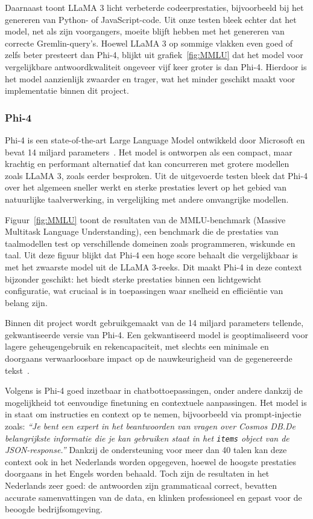 Daarnaast toont LLaMA 3 licht verbeterde codeerprestaties, bijvoorbeeld bij het genereren van Python- of JavaScript-code. 
Uit onze testen bleek echter dat het model, net als zijn voorgangers, moeite blijft hebben met het genereren van correcte Gremlin-query's.
Hoewel LLaMA 3 op sommige vlakken even goed of zelfs beter presteert dan Phi-4, blijkt uit grafiek~\ref{fig:MMLU} dat het model voor vergelijkbare antwoordkwaliteit ongeveer vijf keer groter is dan Phi-4.
Hierdoor is het model aanzienlijk zwaarder en trager, wat het minder geschikt maakt voor implementatie binnen dit project.

\subsubsection{Phi-4}{\label{sec:phi4}}
Phi-4 is een state-of-the-art Large Language Model ontwikkeld door Microsoft en bevat 14 miljard parameters~\autocite{Kamar2024}. 
Het model is ontworpen als een compact, maar krachtig en performant alternatief dat kan concurreren met grotere modellen zoals LLaMA 3, zoals eerder besproken.
Uit de uitgevoerde testen bleek dat Phi-4 over het algemeen sneller werkt en sterke prestaties levert op het gebied van natuurlijke taalverwerking, in vergelijking met andere omvangrijke modellen.

Figuur~\ref{fig:MMLU} toont de resultaten van de MMLU-benchmark (Massive Multitask Language Understanding), een benchmark die de prestaties van taalmodellen test op verschillende domeinen zoals programmeren, wiskunde en taal.
Uit deze figuur blijkt dat Phi-4 een hoge score behaalt die vergelijkbaar is met het zwaarste model uit de LLaMA 3-reeks.
Dit maakt Phi-4 in deze context bijzonder geschikt: het biedt sterke prestaties binnen een lichtgewicht configuratie, wat cruciaal is in toepassingen waar snelheid en efficiëntie van belang zijn.

Binnen dit project wordt gebruikgemaakt van de 14 miljard parameters tellende, gekwantiseerde versie van Phi-4.
Een gekwantiseerd model is geoptimaliseerd voor lagere geheugengebruik en rekencapaciteit, met slechts een minimale en doorgaans verwaarloosbare impact op de nauwkeurigheid van de gegenereerde tekst~\autocite{Qdrant25}.

Volgens \textcite{microsoft2024phi4} is Phi-4 goed inzetbaar in chatbottoepassingen, onder andere dankzij de mogelijkheid tot eenvoudige finetuning en contextuele aanpassingen.
Het model is in staat om instructies en context op te nemen, bijvoorbeeld via prompt-injectie zoals: 
\textit{``Je bent een expert in het beantwoorden van vragen over Cosmos DB.\@ De belangrijkste informatie die je kan gebruiken staat in het \texttt{items} object van de JSON-response.''}
Dankzij de ondersteuning voor meer dan 40 talen kan deze context ook in het Nederlands worden opgegeven, hoewel de hoogste prestaties doorgaans in het Engels worden behaald.
Toch zijn de resultaten in het Nederlands zeer goed: de antwoorden zijn grammaticaal correct, bevatten accurate samenvattingen van de data, en klinken professioneel en gepast voor de beoogde bedrijfsomgeving.

